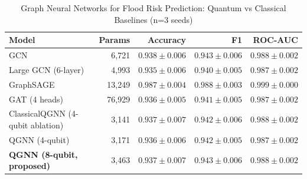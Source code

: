 \begin{table}[h]
\centering
\caption{Graph Neural Networks for Flood Risk Prediction: Quantum vs Classical Baselines (n=3 seeds)}
\label{tab:flood_results}
\begin{tabular}{lrrrr}
\toprule
\textbf{Model} & \textbf{Params} & \textbf{Accuracy} & \textbf{F1} & \textbf{ROC-AUC} \\
\midrule
GCN & 6,721 & $0.938 \pm 0.006$ & $0.943 \pm 0.006$ & $0.988 \pm 0.002$ \\
Large GCN (6-layer) & 4,993 & $0.935 \pm 0.006$ & $0.940 \pm 0.005$ & $0.987 \pm 0.002$ \\
GraphSAGE & 13,249 & $0.987 \pm 0.004$ & $0.988 \pm 0.003$ & $0.999 \pm 0.000$ \\
GAT (4 heads) & 76,929 & $0.936 \pm 0.005$ & $0.941 \pm 0.005$ & $0.987 \pm 0.002$ \\
ClassicalQGNN (4-qubit ablation) & 3,141 & $0.937 \pm 0.007$ & $0.942 \pm 0.006$ & $0.988 \pm 0.002$ \\
QGNN (4-qubit) & 3,171 & $0.936 \pm 0.006$ & $0.942 \pm 0.005$ & $0.987 \pm 0.002$ \\
\textbf{QGNN (8-qubit, proposed)} & 3,463 & $0.937 \pm 0.007$ & $0.943 \pm 0.006$ & \textbf{$0.988 \pm 0.002$} \\
\bottomrule
\end{tabular}
\end{table}
